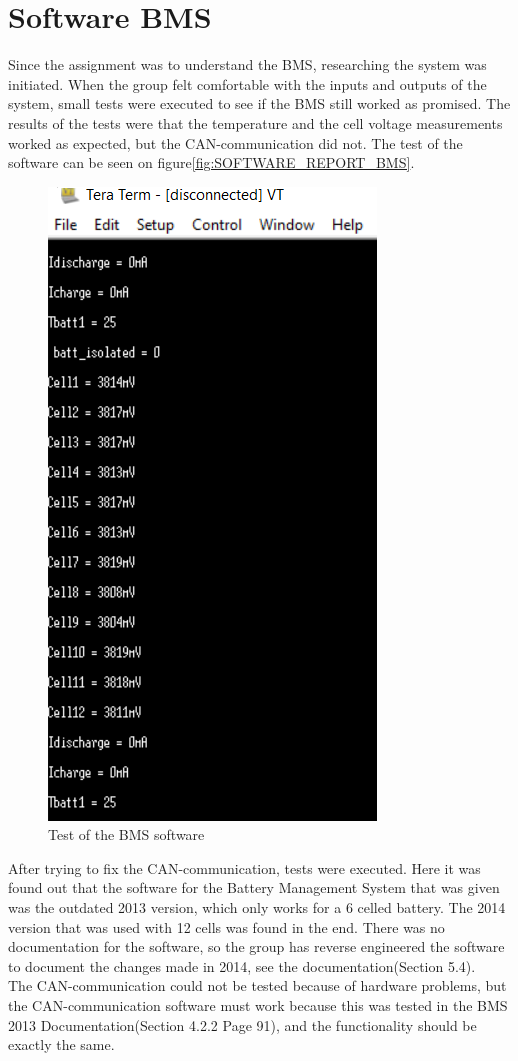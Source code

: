 \section{Software BMS}
Since the assignment was to understand the BMS, researching the system was initiated. When the group felt comfortable with the inputs and outputs of the system, small tests were executed to see if the BMS still worked as promised. The results of the tests were that the temperature and the cell voltage measurements worked as expected, but the CAN-communication did not. The test of the software can be seen on figure\vref{fig:SOFTWARE_REPORT_BMS}.\\

\begin{figure}[H]
	\centering
	\includegraphics[width=0.4\linewidth]{SubPages/Images/BMS_teraterm_test.PNG}
	\caption{Test of the BMS software}
	\label{fig:SOFTWARE_REPORT_BMS}
\end{figure}

After trying to fix the CAN-communication, tests were executed. Here it was found out that the software for the Battery Management System that was given was the outdated 2013 version, which only works for a 6 celled battery. The 2014 version that was used with 12 cells was found in the end. There was no documentation for the software, so the group has reverse engineered the software to document the changes made in 2014, see the documentation\cite{AU2}(Section 5.4).\\
The CAN-communication could not be tested because of hardware problems, but the CAN-communication software must work because this was tested in the BMS 2013 Documentation\cite{BMSDocumentation}(Section 4.2.2 Page 91), and the functionality should be exactly the same.

